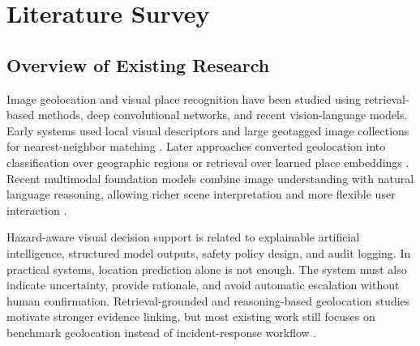 \chapter{Literature Survey}

\section{Overview of Existing Research}
Image geolocation and visual place recognition have been studied using retrieval-based methods, deep convolutional networks, and recent vision-language models. Early systems used local visual descriptors and large geotagged image collections for nearest-neighbor matching \cite{lowe2004distinctive,vo2017revisiting}. Later approaches converted geolocation into classification over geographic regions or retrieval over learned place embeddings \cite{weyand2016planet,arandjelovic2016netvlad}. Recent multimodal foundation models combine image understanding with natural language reasoning, allowing richer scene interpretation and more flexible user interaction \cite{radford2021clip,li2023blip2,liu2024llava,team2024gemini}.

Hazard-aware visual decision support is related to explainable artificial intelligence, structured model outputs, safety policy design, and audit logging. In practical systems, location prediction alone is not enough. The system must also indicate uncertainty, provide rationale, and avoid automatic escalation without human confirmation. Retrieval-grounded and reasoning-based geolocation studies motivate stronger evidence linking, but most existing work still focuses on benchmark geolocation instead of incident-response workflow \cite{zhou2024img2loc,li2025pixels,yerramilli2025geochain}.

